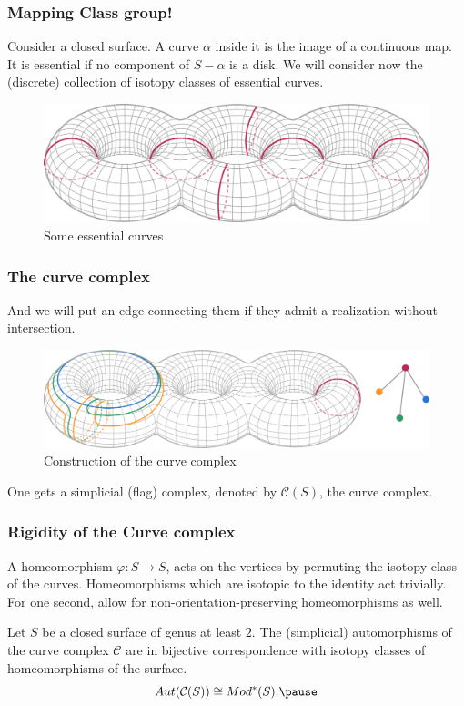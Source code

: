 \documentclass[handout]{beamer}
\theoremstyle{plain}
\begin{document}
\begin{frame}\frametitle{Mapping Class group! }

Consider a  closed  surface. A  curve  $\alpha$ inside  it  is  the  image of  a  continuous  map. It  is  essential if no component of $S-\alpha$ is  a  disk.      
We  will  consider   now  the (discrete) collection of isotopy classes   of  essential  curves.

\begin{figure}[h!]
	\centering
	\includegraphics[scale=0.2]{CHARLA_STOCHASTIC_TOPOLOGY_MCG_CIMATNOVEMBER_2018/Pantalones.png}
	\caption{Some essential curves}
\end{figure}

\end{frame}
\begin{frame} \frametitle{The  curve  complex}

And  we  will  put  an edge  connecting  them  if   they  admit  a realization  without  intersection. 

\begin{figure}[h!]
	\centering
	\includegraphics[scale=0.25]{CHARLA_STOCHASTIC_TOPOLOGY_MCG_CIMATNOVEMBER_2018/Locally-infinite.png}
	\caption{Construction of the curve complex}
\end{figure}

One  gets  a simplicial  (flag) complex,  denoted  by $\mathcal{C}(S)$, the  curve  complex. \pause  
\end{frame}
\begin{frame} \frametitle{Rigidity  of  the  Curve  complex}



A homeomorphism $\varphi: S\to  S$,  acts  on the  vertices by  permuting  the isotopy  class  of  the curves. Homeomorphisms which  are  isotopic  to the  identity  act  trivially. 
For  one  second, allow  for   non-orientation-preserving  homeomorphisms as  well. 

\begin{theorem}[Luo]

Let  $S$  be  a  closed  surface  of  genus  at  least  $2$. The (simplicial) automorphisms  of the curve complex $\mathcal{C}$ are  in bijective correspondence  with  isotopy classes of homeomorphisms  of  the  surface.   \pause 
$$Aut(\mathcal{C}(S))\cong Mod^{*}(S).\pause $$
\end{theorem}

\end{frame}
\end{document}

